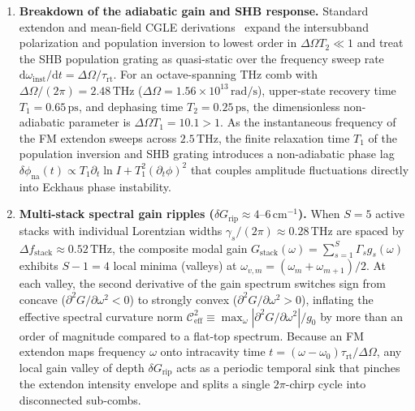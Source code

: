 \documentclass[11pt,letterpaper]{article}
\begin{document}
\begin{enumerate}
    \item \textbf{Breakdown of the adiabatic gain and SHB response.} Standard extendon and mean-field CGLE derivations~\cite{Burghoff2020,Opa2021,Vurgaftman2021} expand the intersubband polarization and population inversion to lowest order in $\Delta\Omega T_2 \ll 1$ and treat the SHB population grating as quasi-static over the frequency sweep rate $\mathrm{d}\omega_{\mathrm{inst}}/\mathrm{d}t = \Delta\Omega/\tau_{\mathrm{rt}}$. For an octave-spanning THz comb with $\Delta\Omega/(2\pi) = 2.48\,\mathrm{THz}$ ($\Delta\Omega = 1.56 \times 10^{13}\,\mathrm{rad/s}$), upper-state recovery time $T_1 = 0.65\,\mathrm{ps}$, and dephasing time $T_2 = 0.25\,\mathrm{ps}$, the dimensionless non-adiabatic parameter is $\Delta\Omega T_1 = 10.1 > 1$. As the instantaneous frequency of the FM extendon sweeps across $2.5\,\mathrm{THz}$, the finite relaxation time $T_1$ of the population inversion and SHB grating introduces a non-adiabatic phase lag $\delta\phi_{\mathrm{na}}(t) \propto T_1 \partial_t \ln I + T_1^2 (\partial_t \phi)^2$ that couples amplitude fluctuations directly into Eckhaus phase instability.
    \item \textbf{Multi-stack spectral gain ripples ($\delta G_{\mathrm{rip}} \approx 4\text{--}6\,\mathrm{cm}^{-1}$).} When $S = 5$ active stacks with individual Lorentzian widths $\gamma_s/(2\pi) \approx 0.28\,\mathrm{THz}$ are spaced by $\Delta f_{\mathrm{stack}} \approx 0.52\,\mathrm{THz}$, the composite modal gain $G_{\mathrm{stack}}(\omega) = \sum_{s=1}^S \Gamma_s g_s(\omega)$ exhibits $S - 1 = 4$ local minima (valleys) at $\omega_{v,m} = (\omega_m + \omega_{m+1})/2$. At each valley, the second derivative of the gain spectrum switches sign from concave ($\partial^2 G/\partial\omega^2 < 0$) to strongly convex ($\partial^2 G/\partial\omega^2 > 0$), inflating the effective spectral curvature norm $\mathcal{C}_{\mathrm{eff}}^2 \equiv \max_\omega |\partial^2 G/\partial\omega^2|/g_0$ by more than an order of magnitude compared to a flat-top spectrum. Because an FM extendon maps frequency $\omega$ onto intracavity time $t = (\omega - \omega_0)\tau_{\mathrm{rt}}/\Delta\Omega$, any local gain valley of depth $\delta G_{\mathrm{rip}}$ acts as a periodic temporal sink that pinches the extendon intensity envelope and splits a single $2\pi$-chirp cycle into disconnected sub-combs.
\end{enumerate}
\end{document}
